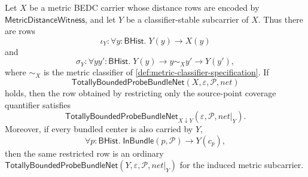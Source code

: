 \begin{theorem}
\label{thm:totallybounded-probebundle-net-subcarrier-restriction}
Let $X$ be a metric BEDC carrier whose distance rows are encoded by
$\mathsf{MetricDistanceWitness}$, and let $Y$ be a classifier-stable subcarrier
of $X$. Thus there are rows
$$
\iota_Y:\forall y:\mathsf{BHist}.\;Y(y)\to X(y)
$$
and
$$
\sigma_Y:\forall y y':\mathsf{BHist}.\;Y(y)\to y\sim_X y'\to Y(y'),
$$
where $\sim_X$ is the metric classifier of \autoref{def:metric-classifier-specification}.
If
$$
\mathsf{TotallyBoundedProbeBundleNet}(X,\varepsilon,\mathcal{P},net)
$$
holds, then the row obtained by restricting only the source-point coverage
quantifier satisfies
$$
\mathsf{TotallyBoundedProbeBundleNet}_{X\downarrow Y}(\varepsilon,\mathcal{P},net|_Y).
$$
Moreover, if every bundled center is also carried by $Y$,
$$
\forall p:\mathsf{BHist}.\;\mathsf{InBundle}(p,\mathcal{P})\to Y(c_p),
$$
then the same restricted row is an ordinary
$\mathsf{TotallyBoundedProbeBundleNet}(Y,\varepsilon,\mathcal{P},net|_Y)$ for
the induced metric subcarrier.
\end{theorem}
